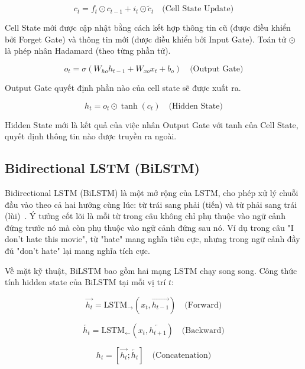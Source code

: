 \documentclass[../BTL.tex]{subfiles}
\begin{document}
\begin{equation}
    c_t = f_t \odot c_{t-1} + i_t \odot \tilde{c}_t \quad \text{(Cell State Update)}
\end{equation}

Cell State mới được cập nhật bằng cách kết hợp thông tin cũ (được điều khiển bởi Forget Gate) và thông tin mới (được điều khiển bởi Input Gate). Toán tử $\odot$ là phép nhân Hadamard (theo từng phần tử).

\begin{equation}
    o_t = \sigma(W_{ho} h_{t-1} + W_{xo} x_t + b_o) \quad \text{(Output Gate)}
\end{equation}

Output Gate quyết định phần nào của cell state sẽ được xuất ra.

\begin{equation}
    h_t = o_t \odot \tanh(c_t) \quad \text{(Hidden State)}
\end{equation}

Hidden State mới là kết quả của việc nhân Output Gate với tanh của Cell State, quyết định thông tin nào được truyền ra ngoài.

\subsection{Bidirectional LSTM (BiLSTM)}
Bidirectional LSTM (BiLSTM) là một mở rộng của LSTM, cho phép xử lý chuỗi đầu vào theo cả hai hướng cùng lúc: từ trái sang phải (tiến) và từ phải sang trái (lùi)~\cite{graves2012supervised}. Ý tưởng cốt lõi là mỗi từ trong câu không chỉ phụ thuộc vào ngữ cảnh đứng trước nó mà còn phụ thuộc vào ngữ cảnh đứng sau nó. Ví dụ trong câu "I don't hate this movie", từ "hate" mang nghĩa tiêu cực, nhưng trong ngữ cảnh đầy đủ "don't hate" lại mang nghĩa tích cực.

Về mặt kỹ thuật, BiLSTM bao gồm hai mạng LSTM chạy song song. Công thức tính hidden state của BiLSTM tại mỗi vị trí $t$:

\begin{equation}
    \overrightarrow{h_t} = \text{LSTM}_{\rightarrow}(x_t, \overrightarrow{h_{t-1}}) \quad \text{(Forward)}
\end{equation}

\begin{equation}
    \overleftarrow{h_t} = \text{LSTM}_{\leftarrow}(x_t, \overleftarrow{h_{t+1}}) \quad \text{(Backward)}
\end{equation}

\begin{equation}
    h_t = [\overrightarrow{h_t}; \overleftarrow{h_t}] \quad \text{(Concatenation)}
\end{equation}
\end{document}
